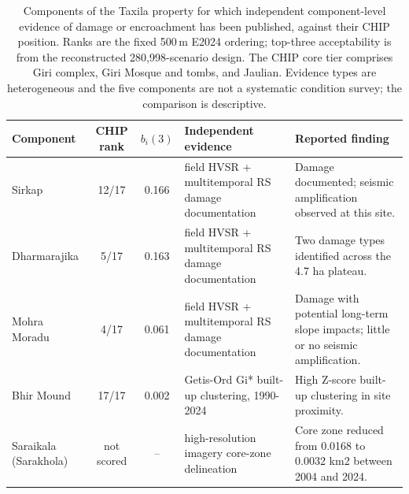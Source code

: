 \begin{table}[tbp]\centering\small
\caption{Components of the Taxila property for which independent component-level evidence of damage or encroachment has been published, against their CHIP position. Ranks are the fixed 500\,m E2024 ordering; top-three acceptability is from the reconstructed 280,998-scenario design. The CHIP core tier comprises Giri complex, Giri Mosque and tombs, and Jaulian. Evidence types are heterogeneous and the five components are not a systematic condition survey; the comparison is descriptive.}\label{tab:external}
\begin{tabular}{p{.20\linewidth}cc p{.21\linewidth} p{.25\linewidth}}\toprule
Component & CHIP rank & $b_i(3)$ & Independent evidence & Reported finding \\\midrule
Sirkap & 12/17 & 0.166 & field HVSR + multitemporal RS damage documentation~\citet{khan2022taxila} & Damage documented; seismic amplification observed at this site. \\
Dharmarajika & 5/17 & 0.163 & field HVSR + multitemporal RS damage documentation~\citet{khan2022taxila} & Two damage types identified across the 4.7 ha plateau. \\
Mohra Moradu & 4/17 & 0.061 & field HVSR + multitemporal RS damage documentation~\citet{khan2022taxila} & Damage with potential long-term slope impacts; little or no seismic amplification. \\
Bhir Mound & 17/17 & 0.002 & Getis-Ord Gi* built-up clustering, 1990-2024~\citet{butt2025taxila} & High Z-score built-up clustering in site proximity. \\
Saraikala (Sarakhola) & not scored & -- & high-resolution imagery core-zone delineation~\citet{butt2025taxila} & Core zone reduced from 0.0168 to 0.0032 km2 between 2004 and 2024. \\
\bottomrule\end{tabular}\end{table}